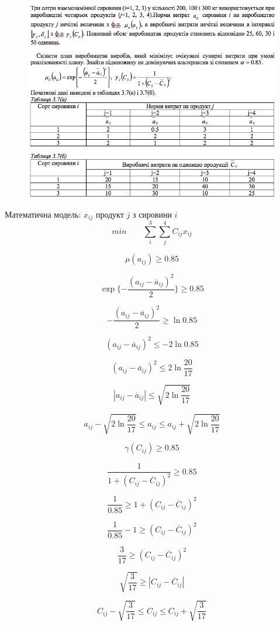 \begin{center}
  \normalsize{}
\end{center}

\begin{figure}[h!]
  \centering
  \includegraphics[width=11.2cm]{3_7.png}
  \centering
\end{figure}


Математична модель: $x_{ij}$ продукт $j$ з сировини $i$
$$
min \qquad   \sum_i^3\sum_j^4 C_{ij} x_{ij}
$$

\begin{multicols}{2}
  $$\mu(a_{ij}) \geqslant 0.85  $$

  $$ \exp\{ - \dfrac{(a_{ij}-\overline{a}_{ij})^2}{2} \} \geqslant 0.85 $$

  $$- \dfrac{(a_{ij}-\overline{a}_{ij})^2}{2} \geqslant \ln{0.85} $$

  $$ (a_{ij}-\overline{a}_{ij})^2 \leqslant -2 \ln{0.85} $$

  $$ (a_{ij}-\overline{a}_{ij})^2 \leqslant 2 \ln{\dfrac{20}{17}} $$


  $$|a_{ij}-\overline{a}_{ij}| \leqslant \sqrt{2\ln{\dfrac{20}{17}}} $$

  $$ a_{ij} - \sqrt{2 \ln{\dfrac{20}{17}}} \leqslant a_{ij} \leqslant a_{ij} + \sqrt{ 2 \ln{\dfrac{20}{17}}}$$

  \columnbreak
  $$\gamma(C_{ij}) \geqslant 0.85 $$

  $$
  \dfrac{1}{1+(C_{ij}-\overline{C}_{ij})^2} \geqslant 0.85
  $$

  $$
  \dfrac{1}{0.85} \geqslant 1+(C_{ij}-\overline{C}_{ij})^2
  $$

  $$
  \dfrac{1}{0.85} - 1 \geqslant (C_{ij}-\overline{C}_{ij})^2
  $$

  $$
  \dfrac{3}{17} \geqslant (C_{ij}-\overline{C}_{ij})^2
  $$

  $$
  \sqrt{\dfrac{3}{17}} \geqslant |C_{ij}-\overline{C}_{ij}|
  $$

  $$
  C_{ij} - \sqrt{\dfrac{3}{17}} \leqslant C_{ij} \leqslant C_{ij} + \sqrt{\dfrac{3}{17}}
  $$

\end{multicols}

